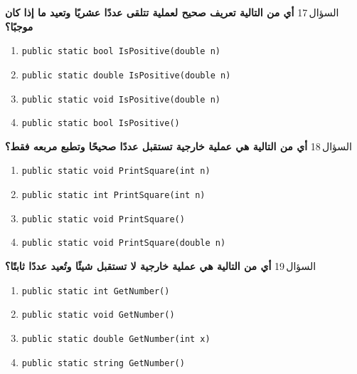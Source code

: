 \documentclass[13pt]{beamer}
\begin{document}
\begin{frame}[fragile]{السؤال\,17}
\textbf{أي من التالية تعريف صحيح لعملية تتلقى عددًا عشريًا وتعيد ما إذا كان موجبًا؟}

\begin{english}
\begin{enumerate}[label=(\alph*)]
  \item \texttt{public static bool IsPositive(double n)}
  \item \texttt{public static double IsPositive(double n)}
  \item \texttt{public static void IsPositive(double n)}
  \item \texttt{public static bool IsPositive()}
\end{enumerate}
\end{english}
\end{frame}

\begin{frame}[fragile]{السؤال\,18}
\textbf{أي من التالية هي عملية خارجية تستقبل عددًا صحيحًا وتطبع مربعه فقط؟}

\begin{english}
\begin{enumerate}[label=(\alph*)]
  \item \texttt{public static void PrintSquare(int n)}
  \item \texttt{public static int PrintSquare(int n)}
  \item \texttt{public static void PrintSquare()}
  \item \texttt{public static void PrintSquare(double n)}
\end{enumerate}
\end{english}
\end{frame}

\begin{frame}[fragile]{السؤال\,19}
\textbf{أي من التالية هي عملية خارجية لا تستقبل شيئًا وتُعيد عددًا ثابتًا؟}

\begin{english}
\begin{enumerate}[label=(\alph*)]
  \item \texttt{public static int GetNumber()}
  \item \texttt{public static void GetNumber()}
  \item \texttt{public static double GetNumber(int x)}
  \item \texttt{public static string GetNumber()}
\end{enumerate}
\end{english}
\end{frame}
\end{document}

